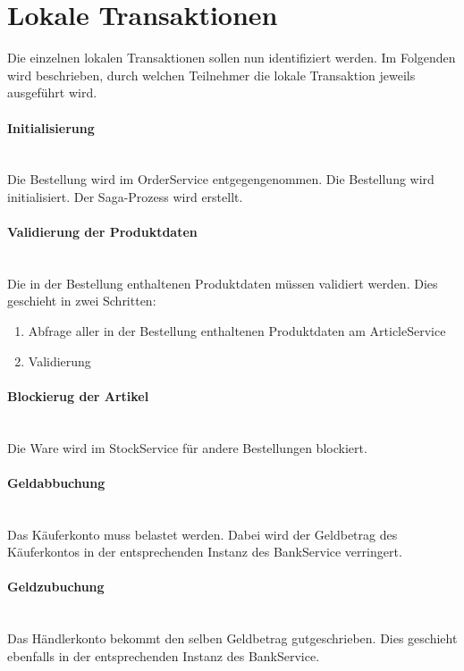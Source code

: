 \section{Lokale Transaktionen}
Die einzelnen lokalen Transaktionen sollen nun identifiziert werden. Im Folgenden wird beschrieben, durch welchen Teilnehmer die lokale Transaktion jeweils ausgeführt wird. 

\paragraph*{Initialisierung} \mbox{}\\
Die Bestellung wird im OrderService entgegengenommen. Die Bestellung wird initialisiert. Der Saga-Prozess wird erstellt. 

\paragraph*{Validierung der Produktdaten} \mbox{}\\
Die in der Bestellung enthaltenen Produktdaten müssen validiert werden. Dies geschieht in zwei Schritten:
\begin{enumerate}
	\item Abfrage aller in der Bestellung enthaltenen Produktdaten am ArticleService
	\item Validierung
\end{enumerate}

\paragraph*{Blockierug der Artikel} \mbox{}\\
Die Ware wird im StockService für andere Bestellungen blockiert. 

\paragraph*{Geldabbuchung} \mbox{}\\
Das Käuferkonto muss belastet werden. Dabei wird der Geldbetrag des Käuferkontos in der entsprechenden Instanz des BankService verringert.

\paragraph*{Geldzubuchung} \mbox{}\\
Das Händlerkonto bekommt den selben Geldbetrag gutgeschrieben. Dies geschieht ebenfalls in der entsprechenden Instanz des BankService. 


